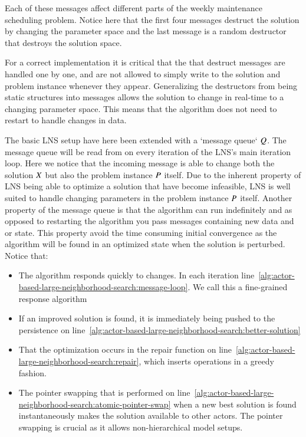Each of these messages affect different parts of the weekly maintenance scheduling 
problem. Notice here that the first four messages destruct the solution by
changing the parameter space and the last message is a random destructor that destroys
the solution space.

For a correct implementation it is critical that the that destruct messages are 
handled one by one, and are not allowed to simply write to the solution and
problem instance whenever they appear.
Generalizing the destructors from being static structures into messages allows
the solution to change in real-time to a changing parameter space. This means
that the algorithm does not need to restart to handle changes in data.



The basic LNS setup have here been extended with a `message queue` $Q$. The message
queue will be read from on every iteration of the LNS's main iteration loop.
Here we notice that the incoming message is able to change both the solution $X$
but also the problem instance $P$ itself. Due to the inherent property of LNS being
able to optimize a solution that have become infeasible, LNS is well suited to handle changing parameters 
in the problem instance $P$ itself. Another property of the message queue is 
that the algorithm can run indefinitely and as opposed to restarting the algorithm you
pass messages containing new data and or state. This property avoid the time consuming initial
convergence as the algorithm will be found in an optimized state when the
solution is perturbed. Notice that:

\begin{itemize}
    \item The algorithm responds quickly to changes. In each iteration line~\ref{alg:actor-based-large-neighborhood-search:message-loop}. We call this a fine-grained response algorithm
    \item If an improved solution is found, it is immediately being pushed to the persistence on line~\ref{alg:actor-based-large-neighborhood-search:better-solution}
    \item That the optimization occurs in the repair function on line~\ref{alg:actor-based-large-neighborhood-search:repair}, which inserts operations in a greedy fashion. 
	\item The pointer swapping that is performed on line~\ref{alg:actor-based-large-neighborhood-search:atomic-pointer-swap} when a new best solution is found instantaneously makes the solution available to other actors. The pointer swapping is crucial as it allows non-hierarchical model setups. 
\end{itemize}

